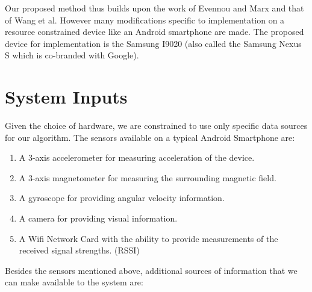\documentclass[10pt,journal,letterpaper,compsoc]{IEEEtran}
\begin{document}
Our proposed method thus builds upon the work of Evennou and Marx\cite{Evennou}
and that of Wang et al\cite{Wang}. However many modifications specific to
implementation on a resource constrained device like an Android smartphone are
made. The proposed device for implementation is the Samsung I9020 (also called
the Samsung Nexus S which is co-branded with Google).



\section{System Inputs\label{sec:system_inputs}}

Given the choice of hardware, we are constrained to use only specific 
data sources for our algorithm. 
The sensors available on a typical Android Smartphone are:
\begin{enumerate}
\item A 3-axis accelerometer for measuring acceleration of the device.
\item A 3-axis magnetometer for measuring the surrounding magnetic field.
\item A gyroscope for providing angular velocity information.
\item A camera for providing visual information.
\item A Wifi Network Card with the ability to provide measurements of the received signal strengths. (RSSI)
\end{enumerate}

Besides the sensors mentioned above, additional sources of information 
that we can make available to the system are:
\end{document}
